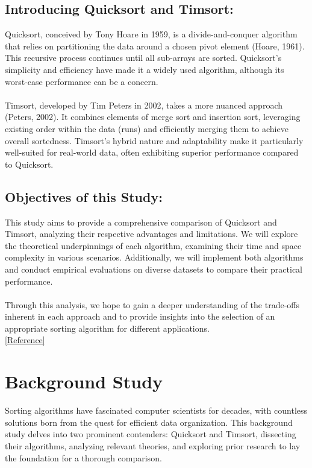 \documentclass[a4paper, 9pt, twocolumn]{article}
\begin{document}
\subsection{Introducing Quicksort and Timsort:}
Quicksort, conceived by Tony Hoare in 1959, is a divide-and-conquer algorithm that relies on partitioning the data around a chosen pivot element (Hoare, 1961). This recursive process continues until all sub-arrays are sorted. Quicksort's simplicity and efficiency have made it a widely used algorithm, although its worst-case performance can be a concern.\\\\
Timsort, developed by Tim Peters in 2002, takes a more nuanced approach (Peters, 2002). It combines elements of merge sort and insertion sort, leveraging existing order within the data (runs) and efficiently merging them to achieve overall sortedness. Timsort's hybrid nature and adaptability make it particularly well-suited for real-world data, often exhibiting superior performance compared to Quicksort.

\subsection{Objectives of this Study:}
This study aims to provide a comprehensive comparison of Quicksort and Timsort, analyzing their respective advantages and limitations. We will explore the theoretical underpinnings of each algorithm, examining their time and space complexity in various scenarios. Additionally, we will implement both algorithms and conduct empirical evaluations on diverse datasets to compare their practical performance.
\\\\
Through this analysis, we hope to gain a deeper understanding of the trade-offs inherent in each approach and to provide insights into the selection of an appropriate sorting algorithm for different applications.
\\
\hyperref[hoare1961]{[Reference]}

\section{Background Study}
Sorting algorithms have fascinated computer scientists for decades, with countless solutions born from the quest for efficient data organization. This background study delves into two prominent contenders: Quicksort and Timsort, dissecting their algorithms, analyzing relevant theories, and exploring prior research to lay the foundation for a thorough comparison.
\end{document}
